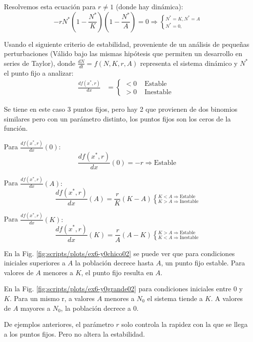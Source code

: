 \documentclass[twocolumn,aps,prl]{revtex4-1}
\newcommand{\Nstar}{N^*}
\begin{document}
Resolvemos esta ecuación para $r\neq 1$ (donde hay dinámica):
\begin{equation}\label{eqn:etiqueta3}
    - r \Nstar  (1 - \frac{\Nstar}{K}) (1 - \frac{\Nstar}{A}) = 0 \Rightarrow \left\lbrace ^{\Nstar = K, \Nstar = A} _{\Nstar = 0, }  \right .
\end{equation}

Usando el siguiente criterio de estabilidad, proveniente de un análisis de pequeñas perturbaciones (Válido bajo las mismas hipótesis que permiten un desarrollo en series de Taylor), donde $\frac{dN}{dt} = f(N, K, r, A)$ representa el sistema dinámico y $\Nstar$ el punto fijo a analizar:
$$
\begin{aligned}
    \frac{d f\left(x^{*}, r\right)}{d x} &=\left\{ 
        \begin{array}{ll}
            <0 & \text { Estable } \\
            >0 & \text { Inestable }
        \end{array}\right.
\end{aligned}
$$

Se tiene en este caso 3 puntos fijos, pero hay 2 que provienen de dos binomios similares pero con un parámetro distinto, los puntos fijos son los ceros de la función.

Para $\frac{d f\left(x^{*}, r\right)}{d x} (0):$ 
$$
\frac{d f\left(x^{*}, r\right)}{d x} (0) = -r \Rightarrow \text{Estable}
$$ 

Para $\frac{d f\left(x^{*}, r\right)}{d x} (A):$ 
$$
\frac{d f\left(x^{*}, r\right)}{d x} (A) = \frac{r}{K} (K-A)  
\left\lbrace
^{ K<A \Rightarrow \text{Estable}}
_{ K>A \Rightarrow \text{Inestable}} \right.
$$ 

Para $\frac{d f\left(x^{*}, r\right)}{d x} (K):$ 
$$
\frac{d f\left(x^{*}, r\right)}{d x} (K) = \frac{r}{A} (A-K) 
\left\lbrace ^{ K>A \Rightarrow \text{Estable}}
_{ K<A \Rightarrow \text{Inestable}} \right.
$$ 

En la Fig. \ref{fig:scripts/plots/ex6-y0chico02} se puede ver que para condiciones iniciales superiores a $A$ la población decrece hasta $A$, un punto fijo estable. Para valores de $A$ menores a $K$, el punto fijo resulta en $A$.

En la Fig. \ref{fig:scripts/plots/ex6-y0grande02} para condiciones iniciales entre 0 y $K$. Para un mismo r, a valores $A$ menores a $N_0$ el sistema tiende a $K$. A valores de $A$ mayores a $N_0$, la población decrece a 0. 

De ejemplos anteriores, el parámetro $r$ solo controla la rapidez con la que se llega a los puntos fijos. Pero no altera la estabilidad.
\end{document}

